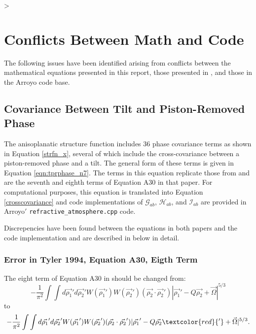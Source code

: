 \def\vrhoone{\vec{\rho_1}}
\def\vrhotwo{\vec{\rho_2}}
>
\section{Conflicts Between Math and Code}
\label{app:issues}

The following issues have been identified arising from conflicts between the 
mathematical equations presented in this report, those presented in 
\cite{Tyler:1994c}, and those in the Arroyo code base. 

\subsection{Covariance Between Tilt and Piston-Removed Phase}

The anisoplanatic structure function includes 36 phase covariance terms as 
shown in Equation \ref{strfn_x}, several of which include the cross-covariance 
between a piston-removed phase and a tilt. The general form of these terms is 
given in Equation \ref{eqn:tprphase_n7}. The terms in this equation replicate 
those from \cite{Tyler:1994c} and are the seventh and eighth terms of Equation 
A30 in that paper. For computational purposes, this equation is translated into 
Equation \ref{crosscovariance} and code implementations of 
$\mathcal{G}_{ab}$, $\mathcal{H}_{ab}$, and $\mathcal{I}_{ab}$ are provided in 
Arroyo$'$ \texttt{refractive\_atmosphere.cpp} code. 

Discrepencies have been found between the equations in both papers and the code 
implementation and are described in below in detail.

\subsubsection{Error in Tyler 1994, Equation A30, Eigth Term}
The eight term of Equation A30 in \cite{Tyler:1994c} should be changed from:
\begin{equation}
\label{eqn:tyler94_A30_t8_orig}
-\frac{1}{\pi^2} \int\int d\vrhoone' d\vrhotwo' W(\vrhoone') W(\vrhotwo')
(\vrhotwo \cdot \vrhotwo') | \vrhoone' - Q \vrhotwo + \vec{\Omega} |^{5/3}
\end{equation}
to
\begin{equation}
\label{eqn:tyler94_A30_t8_new}
-\frac{1}{\pi^2} \int\int d\vrhoone' d\vrhotwo' W(\vrhoone') W(\vrhotwo')
(\vrhotwo \cdot \vrhotwo') | \vrhoone' - Q \vrhotwo\textcolor{red}{'} + \vec{\Omega} |^{5/3}.
\end{equation}

